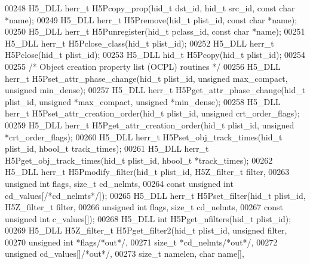\begin{DoxyCode}
00248 H5\_DLL herr\_t H5Pcopy\_prop(hid\_t dst\_id, hid\_t src\_id, \textcolor{keyword}{const} \textcolor{keywordtype}{char} *name);
00249 H5\_DLL herr\_t H5Premove(hid\_t plist\_id, \textcolor{keyword}{const} \textcolor{keywordtype}{char} *name);
00250 H5\_DLL herr\_t H5Punregister(hid\_t pclass\_id, \textcolor{keyword}{const} \textcolor{keywordtype}{char} *name);
00251 H5\_DLL herr\_t H5Pclose\_class(hid\_t plist\_id);
00252 H5\_DLL herr\_t H5Pclose(hid\_t plist\_id);
00253 H5\_DLL hid\_t H5Pcopy(hid\_t plist\_id);
00254 
00255 \textcolor{comment}{/* Object creation property list (OCPL) routines */}
00256 H5\_DLL herr\_t H5Pset\_attr\_phase\_change(hid\_t plist\_id, \textcolor{keywordtype}{unsigned} max\_compact, \textcolor{keywordtype}{unsigned} min\_dense);
00257 H5\_DLL herr\_t H5Pget\_attr\_phase\_change(hid\_t plist\_id, \textcolor{keywordtype}{unsigned} *max\_compact, \textcolor{keywordtype}{unsigned} *min\_dense);
00258 H5\_DLL herr\_t H5Pset\_attr\_creation\_order(hid\_t plist\_id, \textcolor{keywordtype}{unsigned} crt\_order\_flags);
00259 H5\_DLL herr\_t H5Pget\_attr\_creation\_order(hid\_t plist\_id, \textcolor{keywordtype}{unsigned} *crt\_order\_flags);
00260 H5\_DLL herr\_t H5Pset\_obj\_track\_times(hid\_t plist\_id, hbool\_t track\_times);
00261 H5\_DLL herr\_t H5Pget\_obj\_track\_times(hid\_t plist\_id, hbool\_t *track\_times);
00262 H5\_DLL herr\_t H5Pmodify\_filter(hid\_t plist\_id, H5Z\_filter\_t filter,
00263         \textcolor{keywordtype}{unsigned} \textcolor{keywordtype}{int} flags, \textcolor{keywordtype}{size\_t} cd\_nelmts,
00264         \textcolor{keyword}{const} \textcolor{keywordtype}{unsigned} \textcolor{keywordtype}{int} cd\_values[\textcolor{comment}{/*cd\_nelmts*/}]);
00265 H5\_DLL herr\_t H5Pset\_filter(hid\_t plist\_id, H5Z\_filter\_t filter,
00266         \textcolor{keywordtype}{unsigned} \textcolor{keywordtype}{int} flags, \textcolor{keywordtype}{size\_t} cd\_nelmts,
00267         \textcolor{keyword}{const} \textcolor{keywordtype}{unsigned} \textcolor{keywordtype}{int} c\_values[]);
00268 H5\_DLL \textcolor{keywordtype}{int} H5Pget\_nfilters(hid\_t plist\_id);
00269 H5\_DLL H5Z\_filter\_t H5Pget\_filter2(hid\_t plist\_id, \textcolor{keywordtype}{unsigned} filter,
00270        \textcolor{keywordtype}{unsigned} \textcolor{keywordtype}{int} *flags\textcolor{comment}{/*out*/},
00271        \textcolor{keywordtype}{size\_t} *cd\_nelmts\textcolor{comment}{/*out*/},
00272        \textcolor{keywordtype}{unsigned} cd\_values[]\textcolor{comment}{/*out*/},
00273        \textcolor{keywordtype}{size\_t} namelen, \textcolor{keywordtype}{char} name[],

\end{DoxyCode}
